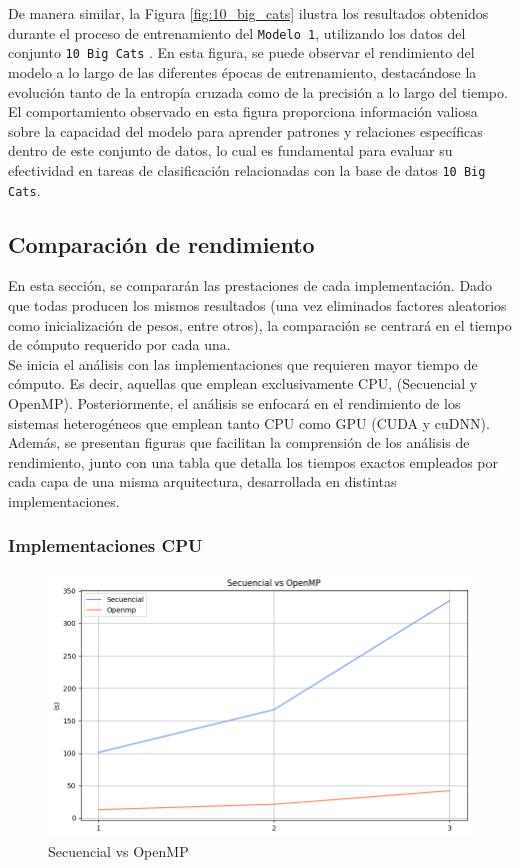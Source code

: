 De manera similar, la Figura \ref{fig:10_big_cats} ilustra los resultados obtenidos durante el proceso de entrenamiento del \texttt{Modelo 1}, utilizando los datos del conjunto \texttt{10 Big Cats} \cite{10_big_cats}. En esta figura, se puede observar el rendimiento del modelo a lo largo de las diferentes épocas de entrenamiento, destacándose la evolución tanto de la entropía cruzada como de la precisión a lo largo del tiempo. El comportamiento observado en esta figura proporciona información valiosa sobre la capacidad del modelo para aprender patrones y relaciones específicas dentro de este conjunto de datos, lo cual es fundamental para evaluar su efectividad en tareas de clasificación relacionadas con la base de datos \texttt{10 Big Cats}.

\subsection{Comparación de rendimiento}

En esta sección, se compararán las prestaciones de cada implementación. Dado que todas producen los mismos resultados (una vez eliminados factores aleatorios como inicialización de pesos, entre otros), la comparación se centrará en el tiempo de cómputo requerido por cada una. \\
Se inicia el análisis con las implementaciones que requieren mayor tiempo de cómputo. Es decir, aquellas que emplean exclusivamente CPU, (Secuencial y OpenMP). Posteriormente, el análisis se enfocará en el rendimiento de los sistemas heterogéneos que emplean tanto CPU como GPU (CUDA y cuDNN). \\
Además, se presentan figuras que facilitan la comprensión  de los análisis de rendimiento, junto con una tabla que detalla los tiempos exactos empleados por cada capa de una misma arquitectura, desarrollada en distintas implementaciones.

\subsubsection{Implementaciones CPU}

\begin{figure}[H]
	\centering
	\includegraphics[scale=0.5]{imagenes/sec_openmp.png}  
	\caption{Secuencial vs OpenMP}
	\label{fig:sec_openmp}
\end{figure}

